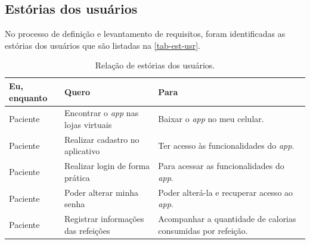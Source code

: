 \subsection{Estórias dos usuários}

No processo de definição e levantamento de requisitos, foram identificadas
as estórias dos usuários que são listadas na \autoref{tab-est-usr}.

\begin{table}[htb]
    \begin{center}
        \ABNTEXfontereduzida
        \caption{Relação de estórias dos usuários.}
        \label{tab-est-usr}
        \begin{tabular}{p{2.0cm}|p{5.0cm}|p{7.0cm}}
            \textbf{Eu, enquanto}                                          & \textbf{Quero} & \textbf{Para}                     \\
            \hline
            Paciente                                                       &
            Encontrar o \emph{app} nas lojas virtuais                      &
            Baixar o \emph{app} no meu celular.                                                                                 \\
            \hline
            Paciente                                                       &
            Realizar cadastro no aplicativo                                &
            Ter acesso às funcionalidades do \emph{app}.                                                                        \\
            \hline
            Paciente                                                       &
            Realizar login de forma prática                                &
            Para acessar as funcionalidades do \emph{app}.                                                                      \\
            \hline
            Paciente                                                       &
            Poder alterar minha senha                                      &
            Poder alterá\@-la e recuperar acesso ao \emph{app}.                                                                 \\
            \hline
            Paciente                                                       &
            Registrar informações das refeições                            &
            Acompanhar a quantidade de calorias consumidas por refeição.                                                        \\

\end{tabular}
\end{center}
\end{table}
